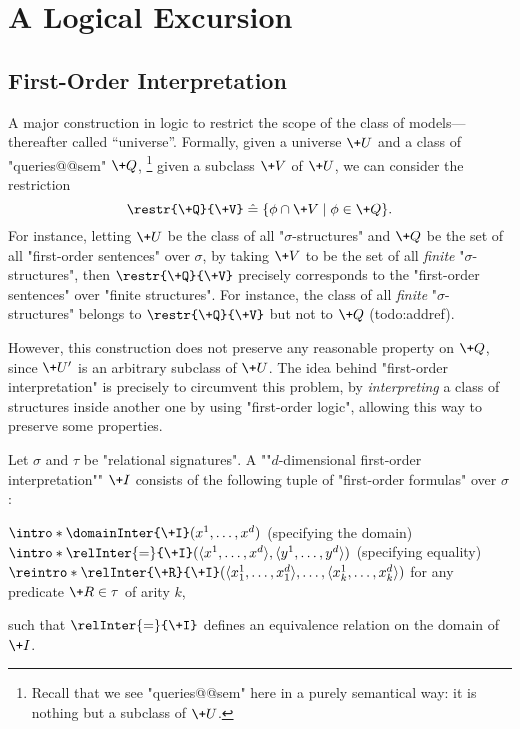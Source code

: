 \section{A Logical Excursion}
\label{sec:preliminaries-automatic-structures-logic}

\subsection{First-Order Interpretation}

A major construction in logic to restrict the scope of the class
of models---thereafter called ``universe''.
Formally, given a universe $\+U$ and a class of "queries@@sem" $\+Q$,%
\footnote{Recall that we see "queries@@sem" here in a purely semantical way: it is nothing but a subclass of $\+U$.}
given a subclass $\+V$ of $\+U$, we can consider the restriction
\[
	\restr{\+Q}{\+V} \defeq \{\phi \cap \+V \mid \phi \in \+Q\}.
\]
For instance, letting $\+U$ be the class of all "$\sigma$-structures" and $\+Q$ be the set of all 
"first-order sentences" over $\sigma$, by taking $\+V$ to be the set of all \emph{finite}
"$\sigma$-structures", then $\restr{\+Q}{\+V}$ precisely corresponds to
the "first-order sentences" over "finite structures". For instance, the class of all
\emph{finite} "$\sigma$-structures" belongs to $\restr{\+Q}{\+V}$ but not to
$\+Q$ (todo:addref).

However, this construction does not preserve any reasonable property on $\+Q$,
since $\+U'$ is an arbitrary subclass of $\+U$. The idea behind "first-order interpretation"
is precisely to circumvent this problem, by \emph{interpreting} a class of structures
inside another one by using "first-order logic", allowing this way to preserve some properties.

Let $\sigma$ and $\tau$ be "relational signatures".
A \AP ""$d$-dimensional first-order interpretation"" $\+I$ consists of the following tuple of
"first-order formulas" over $\sigma$:
\begin{itemize}
	\itemAP $\intro*\domainInter{\+I}(x^1,\hdots, x^d)$ (specifying the domain)
	\itemAP $\intro*\relInter{=}{\+I}(\tup{x^1,\hdots, x^d}, \tup{y^1,\hdots, y^d})$ (specifying equality)
	\itemAP $\reintro*\relInter{\+R}{\+I}(\tup{x^1_1,\hdots,x^d_1}, \hdots, \tup{x^1_k,\hdots,x^d_k})$
		for any predicate $\+R \in \tau$ of arity $k$,
\end{itemize}
such that $\relInter{=}{\+I}$ defines an equivalence relation on the domain of $\+I$.

